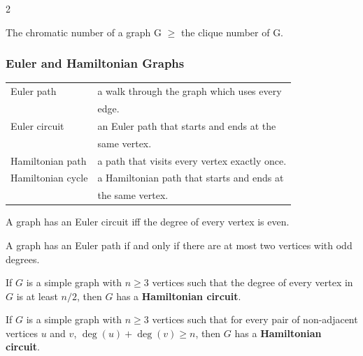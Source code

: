 \documentclass[5pt]{article}
\begin{document}
\begin{multicols}{2}
\begin{theorem}
    The chromatic number of a graph G $\geq$ the clique number of G.
\end{theorem}

\subsubsection{Euler and Hamiltonian Graphs}
\begin{tabular}{ll}
    Euler path          & a walk through the graph which uses every\\
                        & edge.\\
    Euler circuit       & an Euler path that starts and ends at the\\
                        & same vertex.\\
    Hamiltonian path    & a path that visits every vertex exactly once.\\
    Hamiltonian cycle   & a Hamiltonian path that starts and ends at\\
                        & the same vertex.\\
\end{tabular}

\begin{properties}
    \begin{itemize*}
        \item A graph has an Euler circuit iff the degree of every vertex is even.
        \item A graph has an Euler path if and only if there are at most two vertices with odd degrees.
    \end{itemize*}
\end{properties}

\begin{theorem}
    If $G$ is a simple graph with $n\ge 3$ vertices such that the degree of every vertex in $G$ is at least $n/2$,
     then $G$ has a \textbf{Hamiltonian circuit}.
\end{theorem}

\begin{theorem}
    If $G$ is a simple graph with $n\ge 3$ vertices such that for every pair of non-adjacent vertices $u$ and $v$,
     $\deg(u)+\deg(v)\ge n$, then $G$ has a \textbf{Hamiltonian circuit}.
\end{theorem}
\end{multicols}
\end{document}
